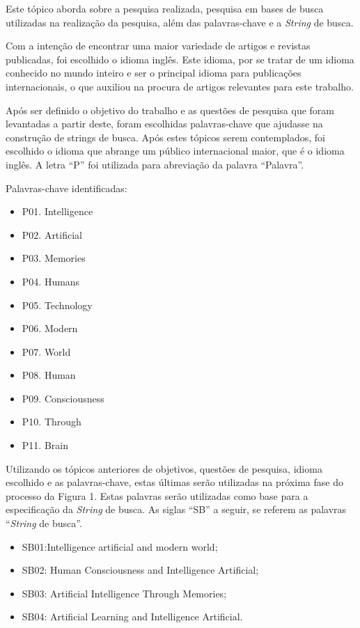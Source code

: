 Este tópico aborda sobre a pesquisa realizada, pesquisa em bases de busca utilizadas na realização da pesquisa, além das palavras-chave e a \textit{String} de busca.

Com a intenção de encontrar uma maior variedade de artigos e revistas publicadas, foi escolhido o idioma inglês. Este idioma, por se tratar de um idioma conhecido no mundo inteiro e ser o principal idioma para publicações internacionais, o que auxiliou na procura de artigos relevantes para este trabalho.

Após ser definido o objetivo do trabalho e as questões de pesquisa que foram levantadas a partir deste, foram escolhidas palavras-chave que ajudasse na construção de strings de busca. Após estes tópicos serem contemplados, foi escolhido o idioma que abrange um público internacional maior, que é o idioma inglês. A letra “P” foi utilizada para abreviação da palavra “Palavra”.

Palavras-chave identificadas:

\begin{itemize}
	\item P01. Intelligence
	\item P02. Artificial
	\item P03. Memories
	\item P04. Humans
    \item P05. Technology
    \item P06. Modern
    \item P07. World
    \item P08. Human
    \item P09. Consciousness
    \item P10. Through
    \item P11. Brain
\end{itemize}

Utilizando os tópicos anteriores de objetivos, questões de pesquisa, idioma escolhido e as palavras-chave, estas últimas serão utilizadas na próxima fase do processo da Figura 1. Estas palavras serão utilizadas como base para a especificação da \textit{String} de busca. As siglas “SB” a seguir, se referem as palavras “\textit{String} de busca”.

\begin{itemize}
    \item SB01:Intelligence artificial and modern world;
	\item SB02: Human Consciousness and Intelligence Artificial;
	\item SB03: Artificial Intelligence Through Memories;
    \item SB04: Artificial Learning and Intelligence Artificial.
\end{itemize}

